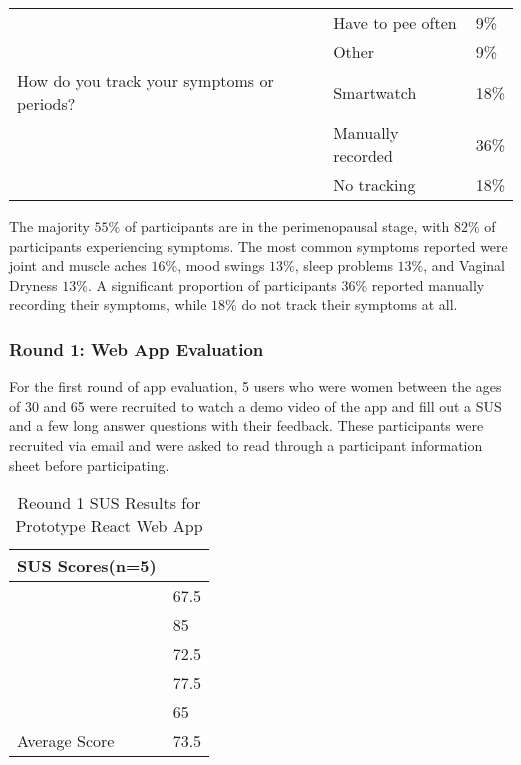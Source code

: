 \begin{table}[h!!]
{\begin{tabular}{lll}
                                                                                        & Have to pee often      & 9\%  \\
                                                                                        & Other                  & 9\%  \\
        How do you track your symptoms or periods?                                      & Smartwatch             & 18\% \\
                                                                                        & Manually recorded      & 36\% \\
                                                                                        & No tracking            & 18\% \\ \hline
        \end{tabular}
    }
  \end{table}

The majority \(55\%\) of participants are in the perimenopausal stage, with \(82\%\) of participants experiencing symptoms. The most common symptoms reported were joint and muscle aches \(16\%\), mood swings \(13\%\), sleep problems \(13\%\), and Vaginal Dryness \(13\%\). A significant proportion of participants \(36\%\) reported manually recording their symptoms, while \(18\%\) do not track their symptoms at all. 

\subsubsection{Round 1: Web App Evaluation}
For the first round of app evaluation, 5 users who were women between the ages of 30 and 65 were recruited to watch a demo video of the app and fill out a SUS and a few long answer questions with their feedback. These participants were recruited via email and were asked to read through a participant information sheet before participating. 
\begin{table}[h!!]
    \caption{Reound 1 SUS Results for Prototype React Web App}
    \label{table:proto-sus}
    \begin{tabular}{ll}
    \hline
    SUS Scores(n=5) &      \\ \hline
                    & 67.5 \\
                    & 85   \\
                    & 72.5 \\
                    & 77.5 \\
                    & 65   \\
        Average Score & 73.5
    \end{tabular}
    \end{table}


